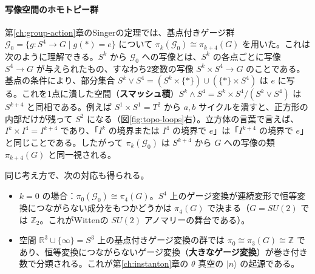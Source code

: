 \documentclass[uplatex, dvipdfmx, book]{jsbook}
\begin{document}
\paragraph{写像空間のホモトピー群}
第\ref{ch:group-action}章のSingerの定理では、基点付きゲージ群 $\mathcal{G}_0 = \{ g: S^4 \to G \mid g(*) = e \}$ について $\pi_k(\mathcal{G}_0) \cong \pi_{k+4}(G)$ を用いた。これは次のように理解できる。$S^k$ から $\mathcal{G}_0$ への写像とは、$S^k$ の各点ごとに写像 $S^4 \to G$ が与えられたもの、すなわち2変数の写像 $S^k \times S^4 \to G$ のことである。基点の条件により、部分集合 $S^k \vee S^4 = (S^k \times \{*\}) \cup (\{*\} \times S^4)$ は $e$ に写る。これを1点に潰した空間（\textbf{スマッシュ積}）$S^k \wedge S^4 = S^k \times S^4 / (S^k \vee S^4)$ は $S^{k+4}$ と同相である。例えば $S^1 \times S^1 = T^2$ から $a, b$ サイクルを潰すと、正方形の内部だけが残って $S^2$ になる（図\ref{fig:topo-loops}右）。立方体の言葉で言えば、$I^k \times I^4 = I^{k+4}$ であり、「$I^k$ の境界または $I^4$ の境界で $e$」は「$I^{k+4}$ の境界で $e$」と同じことである。したがって $\pi_k(\mathcal{G}_0)$ は $S^{k+4}$ から $G$ への写像の類 $\pi_{k+4}(G)$ と同一視される。

同じ考え方で、次の対応も得られる。
\begin{itemize}
    \item $k = 0$ の場合：$\pi_0(\mathcal{G}_0) \cong \pi_4(G)$。$S^4$ 上のゲージ変換が連続変形で恒等変換につながらない成分をもつかどうかは $\pi_4(G)$ で決まる（$G = SU(2)$ では $\mathbb{Z}_2$。これがWittenの $SU(2)$ アノマリーの舞台である）。
    \item 空間 $\mathbb{R}^3 \cup \{\infty\} = S^3$ 上の基点付きゲージ変換の群では $\pi_0 \cong \pi_3(G) \cong \mathbb{Z}$ であり、恒等変換につながらないゲージ変換（\textbf{大きなゲージ変換}）が巻き付き数で分類される。これが第\ref{ch:instanton}章の $\theta$ 真空の $|n\rangle$ の起源である。
\end{itemize}
\end{document}
